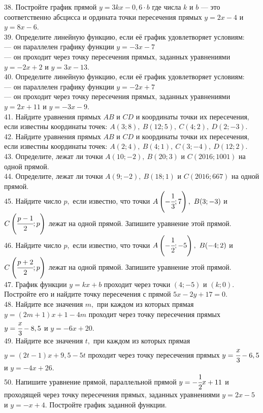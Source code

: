 \documentclass[12pt]{article}
\begin{document}
38. Постройте график прямой $y=3kx-0,6\cdot b$ где числа $k$ и $b$ --- это соответственно абсцисса и ордината точки пересечения прямых $y=2x-4$ и $y=8x-6.$\\
39. Определите линейную функцию, если её график удовлетворяет условиям:\\
--- он параллелен графику функции $y=-3x-7$\\
--- он проходит через точку пересечения прямых, заданных уравнениями $y=-2x+2$ и $y=3x-13.$\\
40. Определите линейную функцию, если её график удовлетворяет условиям:\\
--- он параллелен графику функции $y=-2x+7$\\
--- он проходит через точку пересечения прямых, заданных уравнениями $y=2x+11$ и $y=-3x-9.$\\
41. Найдите уравнения прямых $AB$ и $CD$ и координаты точки их пересечения, если известны координаты точек: $A(3;8),\ B(12;5),\ C(4;2),\ D(2;-3).$\\
42. Найдите уравнения прямых $AB$ и $CD$ и координаты точки их пересечения, если известны координаты точек: $A(2;4),\ B(4;1),\ C(3;-4),\ D(12;2).$\\
43. Определите, лежат ли точки $A(10;-2),\ B(20;3)$ и $C(2016;1001)$ на одной прямой.\\
44. Определите, лежат ли точки $A(9;-2),\ B(18;1)$ и $C(2016;667)$ на одной прямой.\\
45. Найдите число $p,$ если известно, что точки $A\left(-\cfrac{1}{3};7\right),\ B(3;-3)$ и $C\left(\cfrac{p-1}{2}; p\right)$ лежат на одной прямой. Запишите уравнение этой прямой.\\
46. Найдите число $p,$ если известно, что точки $A\left(-\cfrac{1}{2};-5\right),\ B(-4;2)$ и $C\left(\cfrac{p+2}{2}; p\right)$ лежат на одной прямой. Запишите уравнение этой прямой.\\
47. График функции $y=kx+b$ проходит через точки $(4;-5)$ и $(k;0).$ Постройте его и найдите точку пересечения с прямой $5x-2y+17=0.$\\
48. Найдите все значения $m,$ при каждом из которых прямая $y=(2m+1)x+1-4m$ проходит через точку пересечения прямых $y=\cfrac{x}{3}-8,5$ и $y=-6x+20.$\\
49. Найдите все значения $t,$ при каждом из которых прямая $y=(2t-1)x+9,5-5t$ проходит через точку пересечения прямых $y=\cfrac{x}{3}-6,5$ и $y=-4x+26.$\\
50. Напишите уравнение прямой, параллельной прямой $y=-\cfrac{1}{2}x+11$  и проходящей через точку пересечения прямых, заданных уравнениями $y=2x-5$ и $y=-x+4.$ Постройте график заданной функции.\\
\end{document}

